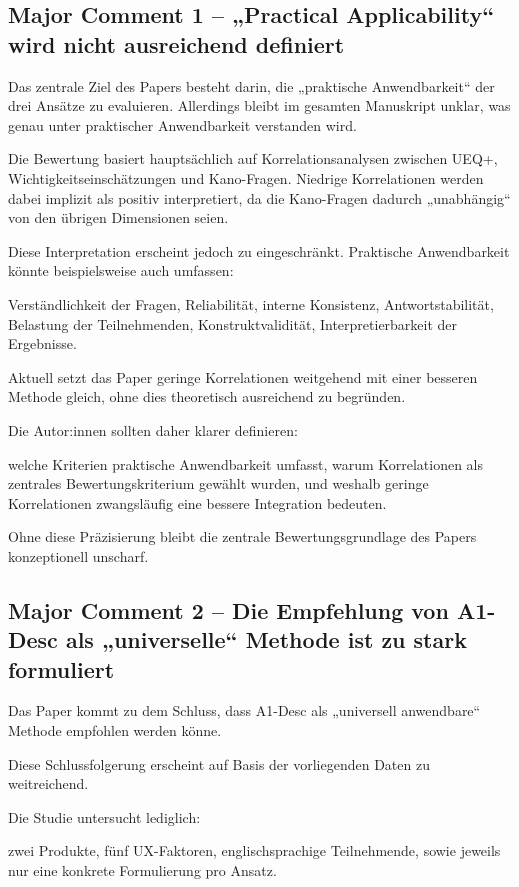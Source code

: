 \documentclass[12pt,DIV=14, version=first, BCOR=10mm,a4paper,twoside,parskip=half-,headsepline,headinclude]{scrartcl}
\begin{document}
\subsection{Major Comment 1 – „Practical Applicability“ wird nicht ausreichend definiert}

Das zentrale Ziel des Papers besteht darin, die „praktische Anwendbarkeit“ der drei Ansätze zu evaluieren. Allerdings bleibt im gesamten Manuskript unklar, was genau unter praktischer Anwendbarkeit verstanden wird.

Die Bewertung basiert hauptsächlich auf Korrelationsanalysen zwischen UEQ+, Wichtigkeitseinschätzungen und Kano-Fragen. Niedrige Korrelationen werden dabei implizit als positiv interpretiert, da die Kano-Fragen dadurch „unabhängig“ von den übrigen Dimensionen seien.

Diese Interpretation erscheint jedoch zu eingeschränkt. Praktische Anwendbarkeit könnte beispielsweise auch umfassen:

Verständlichkeit der Fragen,
Reliabilität,
interne Konsistenz,
Antwortstabilität,
Belastung der Teilnehmenden,
Konstruktvalidität,
Interpretierbarkeit der Ergebnisse.

Aktuell setzt das Paper geringe Korrelationen weitgehend mit einer besseren Methode gleich, ohne dies theoretisch ausreichend zu begründen.

Die Autor:innen sollten daher klarer definieren:

welche Kriterien praktische Anwendbarkeit umfasst,
warum Korrelationen als zentrales Bewertungskriterium gewählt wurden,
und weshalb geringe Korrelationen zwangsläufig eine bessere Integration bedeuten.

Ohne diese Präzisierung bleibt die zentrale Bewertungsgrundlage des Papers konzeptionell unscharf.

\subsection{Major Comment 2 – Die Empfehlung von A1-Desc als „universelle“ Methode ist zu stark formuliert}

Das Paper kommt zu dem Schluss, dass A1-Desc als „universell anwendbare“ Methode empfohlen werden könne.

Diese Schlussfolgerung erscheint auf Basis der vorliegenden Daten zu weitreichend.

Die Studie untersucht lediglich:

zwei Produkte,
fünf UX-Faktoren,
englischsprachige Teilnehmende,
sowie jeweils nur eine konkrete Formulierung pro Ansatz.
\end{document}
